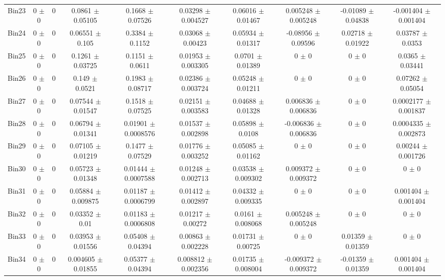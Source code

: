 \begin{tabular}{@{\extracolsep{4pt}}lccccccccc@{}}
     Bin23 & 0 $\pm$ 0 & 0 & 0.0861 $\pm$ 0.05105 & 0.1668 $\pm$ 0.07526 & 0.03298 $\pm$ 0.004527 & 0.06016 $\pm$ 0.01467 & 0.005248 $\pm$ 0.005248 & -0.01089 $\pm$ 0.04838 & -0.001404 $\pm$ 0.001404 \\ 
     Bin24 & 0 $\pm$ 0 & 0 & 0.06551 $\pm$ 0.105 & 0.3384 $\pm$ 0.1152 & 0.03068 $\pm$ 0.00423 & 0.05934 $\pm$ 0.01317 & -0.08956 $\pm$ 0.09596 & 0.02718 $\pm$ 0.01922 & 0.03787 $\pm$ 0.0353 \\ 
     Bin25 & 0 $\pm$ 0 & 0 & 0.1261 $\pm$ 0.03725 & 0.1151 $\pm$ 0.0611 & 0.01953 $\pm$ 0.003305 & 0.0701 $\pm$ 0.01389 & 0 $\pm$ 0 & 0 $\pm$ 0 & 0.0365 $\pm$ 0.03441 \\ 
     Bin26 & 0 $\pm$ 0 & 0 & 0.149 $\pm$ 0.0521 & 0.1983 $\pm$ 0.08717 & 0.02386 $\pm$ 0.003724 & 0.05248 $\pm$ 0.01211 & 0 $\pm$ 0 & 0 $\pm$ 0 & 0.07262 $\pm$ 0.05054 \\ 
     Bin27 & 0 $\pm$ 0 & 0 & 0.07544 $\pm$ 0.01547 & 0.1518 $\pm$ 0.07525 & 0.02151 $\pm$ 0.003583 & 0.04688 $\pm$ 0.01328 & 0.006836 $\pm$ 0.006836 & 0 $\pm$ 0 & 0.0002177 $\pm$ 0.001837 \\ 
     Bin28 & 0 $\pm$ 0 & 0 & 0.06794 $\pm$ 0.01341 & 0.01901 $\pm$ 0.0008576 & 0.01537 $\pm$ 0.002898 & 0.05898 $\pm$ 0.0108 & -0.006836 $\pm$ 0.006836 & 0 $\pm$ 0 & 0.0004335 $\pm$ 0.002873 \\ 
     Bin29 & 0 $\pm$ 0 & 0 & 0.07105 $\pm$ 0.01219 & 0.1477 $\pm$ 0.07529 & 0.01776 $\pm$ 0.003252 & 0.05085 $\pm$ 0.01162 & 0 $\pm$ 0 & 0 $\pm$ 0 & 0.00244 $\pm$ 0.001726 \\ 
     Bin30 & 0 $\pm$ 0 & 0 & 0.05723 $\pm$ 0.01348 & 0.01444 $\pm$ 0.0007588 & 0.01248 $\pm$ 0.002713 & 0.03538 $\pm$ 0.009302 & 0.009372 $\pm$ 0.009372 & 0 $\pm$ 0 & 0 $\pm$ 0 \\ 
     Bin31 & 0 $\pm$ 0 & 0 & 0.05884 $\pm$ 0.009875 & 0.01187 $\pm$ 0.0006799 & 0.01412 $\pm$ 0.002897 & 0.04332 $\pm$ 0.009335 & 0 $\pm$ 0 & 0 $\pm$ 0 & 0.001404 $\pm$ 0.001404 \\ 
     Bin32 & 0 $\pm$ 0 & 0 & 0.03352 $\pm$ 0.01 & 0.01183 $\pm$ 0.0006808 & 0.01217 $\pm$ 0.00272 & 0.0161 $\pm$ 0.008068 & 0.005248 $\pm$ 0.005248 & 0 $\pm$ 0 & 0 $\pm$ 0 \\ 
     Bin33 & 0 $\pm$ 0 & 0 & 0.03953 $\pm$ 0.01556 & 0.05408 $\pm$ 0.04394 & 0.00863 $\pm$ 0.002228 & 0.01731 $\pm$ 0.00725 & 0 $\pm$ 0 & 0.01359 $\pm$ 0.01359 & 0 $\pm$ 0 \\ 
     Bin34 & 0 $\pm$ 0 & 0 & 0.004605 $\pm$ 0.01855 & 0.05377 $\pm$ 0.04394 & 0.008812 $\pm$ 0.002356 & 0.01735 $\pm$ 0.008004 & -0.009372 $\pm$ 0.009372 & -0.01359 $\pm$ 0.01359 & 0.001404 $\pm$ 0.001404 \\ 

\end{tabular}
